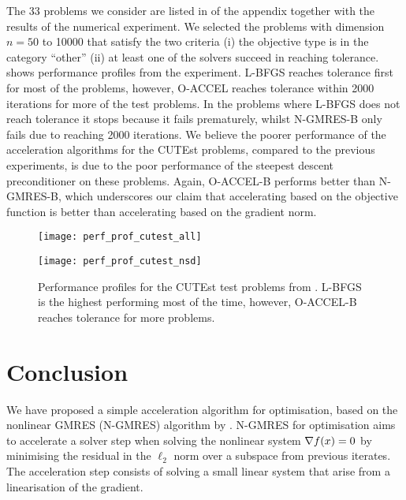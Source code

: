 \documentclass[main.tex]{subfiles}
\begin{document}
The \num{33} problems we consider are listed in
 of the appendix together
with the results of the numerical experiment.  We selected the
problems with dimension $n=50$ to \num{10000} that satisfy the two
criteria (i) the objective type is in the category ``other'' (ii) at
least one of the solvers succeed in reaching tolerance.
 shows performance profiles from the
experiment. L-BFGS reaches tolerance first for most of the problems,
however, O-ACCEL reaches tolerance within \num{2000} iterations for
more of the test problems. In the problems where L-BFGS does not reach
tolerance it stops because it fails prematurely, whilst N-GMRES-B only
fails due to reaching \num{2000} iterations.  We believe the poorer
performance of the acceleration algorithms for the CUTEst problems,
compared to the previous experiments, is due to the poor performance
of the steepest descent preconditioner on these problems.  Again,
O-ACCEL-B performs better than N-GMRES-B, which underscores our claim
that accelerating based on the objective function is better than
accelerating based on the gradient norm.
\begin{figure}[htb]
  \centering
  \begin{minipage}{0.499\textwidth}
    \texttt{[image: perf\_prof\_cutest\_all]}
  \end{minipage}%
  \begin{minipage}{0.499\textwidth}
    \texttt{[image: perf\_prof\_cutest\_nsd]}
  \end{minipage}
  \caption{Performance profiles for the CUTEst test problems from
    .  L-BFGS is the highest
    performing most of the time, however, O-ACCEL-B reaches tolerance
    for more problems.}\label{fig:perf_prof_cutest}
\end{figure}

\section{Conclusion}\label{sec:conclusion}
We have proposed a simple acceleration algorithm for optimisation,
based on the nonlinear GMRES (N-GMRES) algorithm by
\citet{washio1997krylov,sterck2013steepest}.  N-GMRES for optimisation
aims to accelerate a solver step when solving the nonlinear system
$\nabla f(x)=0$ by minimising the residual in the $\ell_2$ norm over
a subspace from previous iterates.  The acceleration step consists of
solving a small linear system that arise from a linearisation of the
gradient.
\end{document}
